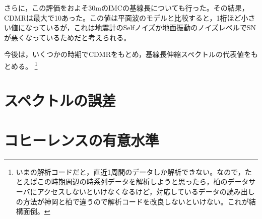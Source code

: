 さらに，この評価をおよそ30mのIMCの基線長についても行った。その結果，CDMRは最大で10あった。この値は平面波のモデルと比較すると，1桁ほど小さい値になっているが，これは地震計のSelfノイズか地面振動のノイズレベルでSNが悪くなっているためだと考えられる。

今後は，いくつかの時期でCDMRをもとめ，基線長伸縮スペクトルの代表値をもとめる。 \footnote[13]{いまの解析コードだと，直近1周間のデータしか解析できない。なので，たとえばこの時期周辺の時系列データを解析しようと思ったら，柏のデータサーバにアクセスしないといけなくなるけど，対応しているデータの読み出しの方法が神岡と柏で違うので解析コードを改良しないといけない。これが結構面倒。}


\appendix
\section{スペクトルの誤差}
\section{コヒーレンスの有意水準}



